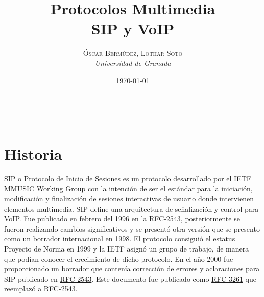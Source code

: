 \documentclass[a4paper, 11pt]{article} %
\title{\textbf{Protocolos Multimedia}\\ %
\vspace{20 pt}
SIP y VoIP} %
\author{\textsc{Óscar Bermúdez, Lothar Soto} %
\\{\textit{Universidad de Granada}}} %
\date{\today} %
\makeatletter
\newcommand{\RFC}[1]{\href{https://www.ietf.org/rfc/rfc#1.txt}{RFC-#1}}
\renewcommand{\maketitle}{ %
\begin{center} %
{\Huge\@title} %
\end{center}

\vspace{20pt} %

\begin{flushright} %
{\large\@author} %
\\\@date %

\vspace{40pt} %
\end{flushright}
}
\makeatother
\begin{document}
\maketitle %

{\parskip=2pt
\tableofcontents
}
\pagebreak

\section{Historia}
SIP o Protocolo de Inicio de Sesiones es un protocolo desarrollado por el IETF MMUSIC Working Group con la intención de ser el estándar para la iniciación, modificación y finalización de sesiones interactivas de usuario donde intervienen elementos multimedia. SIP define una arquitectura de señalización y control para VoIP. Fue publicado en febrero del 1996 en la \RFC{2543}, posteriormente se fueron realizando cambios significativos y se presentó otra versión que se presento como un borrador internacional en 1998. El protocolo consiguió el estatus Proyecto de Norma en 1999 y la IETF asignó un grupo de trabajo, de manera que podían conocer el crecimiento de dicho protocolo. En el año 2000 fue proporcionado un borrador que contenía corrección de errores y aclaraciones para SIP publicado en \RFC{2543}. Este documento fue publicado como \RFC{3261} que reemplazó a \RFC{2543}.
\end{document}
